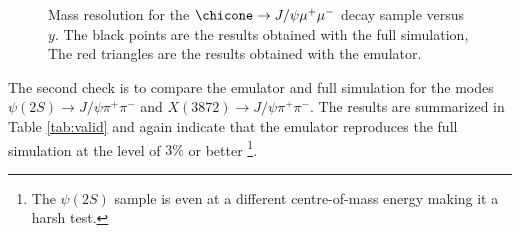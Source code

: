 %
\begin{figure}[htb!]
\begin{center}
\caption{\small Mass resolution for the $\chicone \rightarrow J/\psi
  \mu^+ \mu^-$ decay sample versus $y$.  The black points are
  the results obtained with the full simulation, The red triangles are the results
  obtained with the emulator. }
\label{fig:sigmay}
\end{center}
\end{figure}

The second check is to compare the emulator and full simulation for
the modes $\psi(2S) \rightarrow J/\psi \pi^+ \pi^-$ and $X(3872)
\rightarrow J/\psi \pi^+ \pi^-$. The results are summarized in Table
\ref{tab:valid} and again indicate that the emulator reproduces the full
simulation at the level of $3 \%$ or better \footnote{The $\psi(2S)$
  sample is even at a different centre-of-mass energy making it a harsh test.}.

